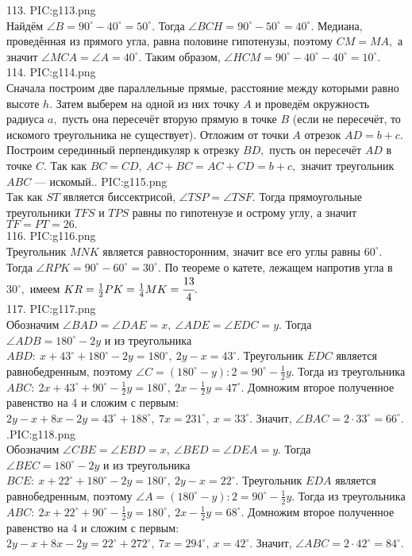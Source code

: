 113. {{PIC:g113.png}}\\
Найдём $\angle B=90^\circ-40^\circ=50^\circ.$ Тогда $\angle BCH=90^\circ-50^\circ=40^\circ.$ Медиана, проведённая из прямого угла, равна половине гипотенузы, поэтому $CM=MA,$ а значит $\angle MCA=\angle A=40^\circ.$ Таким образом, $\angle HCM=90^\circ-40^\circ-40^\circ=10^\circ.$\\
114. {{PIC:g114.png}}\\
Сначала построим две параллельные прямые, расстояние между которыми равно высоте $h.$ Затем выберем на одной из них точку $A$ и проведём окружность радиуса $a,$ пусть она пересечёт вторую прямую в точке $B$ (если не пересечёт, то искомого треугольника не существует). Отложим от точки $A$ отрезок $AD=b+c.$ Построим серединный перпендикуляр к отрезку $BD,$ пусть он пересечёт $AD$ в точке $C.$ Так как $BC=CD,\ AC+BC=AC+CD=b+c,$ значит треугольник $ABC$ --- искомый.\newpage{}. {{PIC:g115.png}}\\
Так как $ST$ является биссектрисой, $\angle TSP=\angle TSF.$ Тогда прямоугольные треугольники $TFS$ и $TPS$ равны по гипотенузе и острому углу, а значит $TF=PT=26.$\\
116. {{PIC:g116.png}}\\
Треугольник $MNK$ является равносторонним, значит все его углы равны $60^\circ.$ Тогда $\angle RPK=90^\circ-60^\circ=30^\circ.$ По теореме о катете, лежащем напротив угла в $30^\circ,$ имеем $KR=\frac{1}{2}PK=\frac{1}{4}MK=\cfrac{13}{4}.$\\
117. {{PIC:g117.png}}\\
Обозначим $\angle BAD=\angle DAE=x,\ \angle ADE=\angle EDC=y.$ Тогда $\angle ADB=180^\circ-2y$ и из треугольника $ABD:\ x+43^\circ+180^\circ-2y=180^\circ,\ 2y-x=43^\circ.$ Треугольник $EDC$ является равнобедренным, поэтому $\angle C=(180^\circ-y):2=90^\circ-\frac{1}{2}y.$ Тогда из треугольника $ABC:\ 2x+43^\circ+90^\circ-\frac{1}{2}y=180^\circ,\ 2x-\frac{1}{2}y=47^\circ.$ Домножим второе полученное равенство на 4 и сложим с первым: $2y-x+8x-2y=43^\circ+188^\circ,\ 7x=231^\circ,\ x=33^\circ.$ Значит, $\angle BAC=2\cdot33^\circ=66^\circ.$\newpage{}.{{PIC:g118.png}}\\
Обозначим $\angle CBE=\angle EBD=x,\ \angle BED=\angle DEA=y.$ Тогда $\angle BEC=180^\circ-2y$ и из треугольника $BCE:\ x+22^\circ+180^\circ-2y=180^\circ,\ 2y-x=22^\circ.$ Треугольник $EDA$ является равнобедренным, поэтому $\angle A=(180^\circ-y):2=90^\circ-\frac{1}{2}y.$ Тогда из треугольника $ABC:\ 2x+22^\circ+90^\circ-\frac{1}{2}y=180^\circ,\ 2x-\frac{1}{2}y=68^\circ.$ Домножим второе полученное равенство на 4 и сложим с первым: $2y-x+8x-2y=22^\circ+272^\circ,\ 7x=294^\circ,\ x=42^\circ.$ Значит, $\angle ABC=2\cdot42^\circ=84^\circ.$\\
